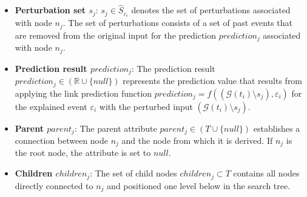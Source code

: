 \begin{itemize}
    \item \textbf{Perturbation set $s_j$}: $s_j \in \hat{S}_{\varepsilon_i}$ denotes the set of perturbations associated with node $n_j$. The set of perturbations consists of a set of past events that are removed from the original input for the prediction $prediction_j$ associated with node $n_j$.

    \item \textbf{Prediction result $prediction_j$}: The prediction result $prediction_j \in (\mathbb{R} \cup \{null\})$ represents the prediction value that results from applying the link prediction function $prediction_j = f((\mathcal{G}(t_i) \setminus s_j), \varepsilon_i)$ for the explained event $\varepsilon_i$ with the perturbed input $(\mathcal{G}(t_i) \setminus s_j)$.

    \item \textbf{Parent $parent_j$}: The parent attribute $parent_j \in (T \cup \{null\})$ establishes a connection between node $n_j$ and the node from which it is derived. If $n_j$ is the root node, the attribute is set to $null$.

    \item \textbf{Children $children_j$}: The set of child nodes $children_j \subset T$ contains all nodes directly connected to $n_j$ and positioned one level below in the search tree.



\end{itemize}

